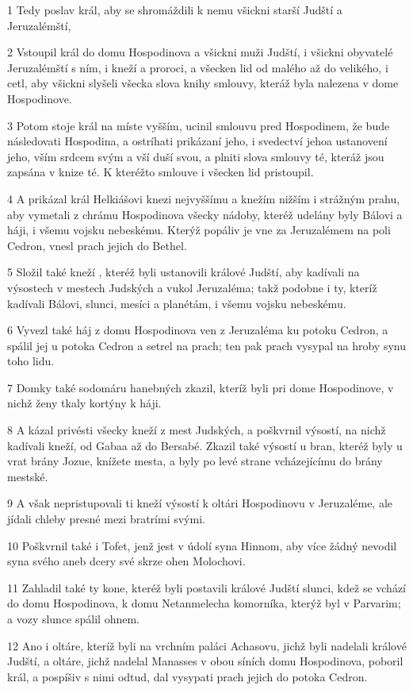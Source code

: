 \par 1 Tedy poslav král, aby se shromáždili k nemu všickni starší Judští a Jeruzalémští,
\par 2 Vstoupil král do domu Hospodinova a všickni muži Judští, i všickni obyvatelé Jeruzalémští s ním, i kneží a proroci, a všecken lid od malého až do velikého, i cetl, aby všickni slyšeli všecka slova knihy smlouvy, kteráž byla nalezena v dome Hospodinove.
\par 3 Potom stoje král na míste vyšším, ucinil smlouvu pred Hospodinem, že bude následovati Hospodina, a ostríhati prikázaní jeho, i svedectví jehoa ustanovení jeho, vším srdcem svým a vší duší svou, a plniti slova smlouvy té, kteráž jsou zapsána v knize té. K kteréžto smlouve i všecken lid pristoupil.
\par 4 A prikázal král Helkiášovi knezi nejvyššímu a knežím nižším i strážným prahu, aby vymetali z chrámu Hospodinova všecky nádoby, kteréž udelány byly Bálovi a háji, i všemu vojsku nebeskému. Kterýž popáliv je vne za Jeruzalémem na poli Cedron, vnesl prach jejich do Bethel.
\par 5 Složil také kneží , kteréž byli ustanovili králové Judští, aby kadívali na výsostech v mestech Judských a vukol Jeruzaléma; takž podobne i ty, kteríž kadívali Bálovi, slunci, mesíci a planétám, i všemu vojsku nebeskému.
\par 6 Vyvezl také háj z domu Hospodinova ven z Jeruzaléma ku potoku Cedron, a spálil jej u potoka Cedron a setrel na prach; ten pak prach vysypal na hroby synu toho lidu.
\par 7 Domky také sodomáru hanebných zkazil, kteríž byli pri dome Hospodinove, v nichž ženy tkaly kortýny k háji.
\par 8 A kázal privésti všecky kneží z mest Judských, a poškvrnil výsostí, na nichž kadívali kneží, od Gabaa až do Bersabé. Zkazil také výsostí u bran, kteréž byly u vrat brány Jozue, knížete mesta, a byly po levé strane vcházejícímu do brány mestské.
\par 9 A však nepristupovali ti kneží výsostí k oltári Hospodinovu v Jeruzaléme, ale jídali chleby presné mezi bratrími svými.
\par 10 Poškvrnil také i Tofet, jenž jest v údolí syna Hinnom, aby více žádný nevodil syna svého aneb dcery své skrze ohen Molochovi.
\par 11 Zahladil také ty kone, kteréž byli postavili králové Judští slunci, kdež se vchází do domu Hospodinova, k domu Netanmelecha komorníka, kterýž byl v Parvarim; a vozy slunce spálil ohnem.
\par 12 Ano i oltáre, kteríž byli na vrchním paláci Achasovu, jichž byli nadelali králové Judští, a oltáre, jichž nadelal Manasses v obou síních domu Hospodinova, poboril král, a pospíšiv s nimi odtud, dal vysypati prach jejich do potoka Cedron.
